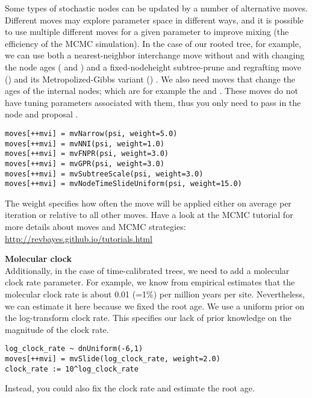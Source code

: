 \begin{framed}
Some types of stochastic nodes can be updated by a number of alternative moves. 
Different moves may explore parameter space in different ways, and it is possible to use multiple different moves for a given parameter to improve mixing (the efficiency of the MCMC simulation). 
In the case of our rooted tree, for example, we can use both a nearest-neighbor interchange move without and with changing the node ages ( and ) and a fixed-nodeheight subtree-prune and regrafting move () and its Metropolized-Gibbs variant () \citep{Hoehna2008,Hoehna2012}. 
We also need moves that change the ages of the internal nodes; which are for example the  and .
These moves do not have tuning parameters associated with them, thus you only need to pass in the  node and proposal . 
{\tt \begin{snugshade*}
\begin{lstlisting}
moves[++mvi] = mvNarrow(psi, weight=5.0)
moves[++mvi] = mvNNI(psi, weight=1.0)
moves[++mvi] = mvFNPR(psi, weight=3.0)
moves[++mvi] = mvGPR(psi, weight=3.0)
moves[++mvi] = mvSubtreeScale(psi, weight=3.0)
moves[++mvi] = mvNodeTimeSlideUniform(psi, weight=15.0)
\end{lstlisting}
\end{snugshade*}}
The weight specifies how often the move will be applied either on average per iteration or relative to all other moves.
Have a look at the MCMC tutorial for more details about moves and MCMC strategies: \href{http://revbayes.github.io/tutorials.html}{http://revbayes.github.io/tutorials.html}
\vspace{0.3cm}

\textbf{Molecular clock}\\
Additionally, in the case of time-calibrated trees, we need to add a molecular clock rate parameter.
For example, we know from empirical estimates that the molecular clock rate is about  0.01 (=1\%) per million years per site.
Nevertheless, we can estimate it here because we fixed the root age.
We use a uniform prior on the log-transform clock rate.
This specifies our lack of prior knowledge on the magnitude of the clock rate.
{\tt \begin{snugshade*}
\begin{lstlisting}
log_clock_rate ~ dnUniform(-6,1)
moves[++mvi] = mvSlide(log_clock_rate, weight=2.0)
clock_rate := 10^log_clock_rate
\end{lstlisting}
\end{snugshade*}}

Instead, you could also fix the clock rate and estimate the root age.

\end{framed}


